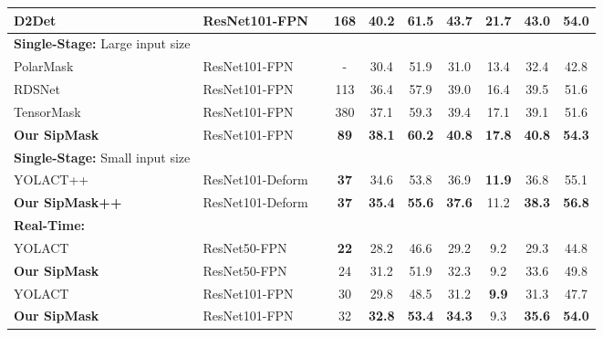 \documentclass[runningheads]{llncs}
\begin{document}
\begin{table*}[t!]
{\begin{tabular}{|l|l|c|c|c|cc|ccc|}
D2Det \cite{Cao_D2Det_CVPR_2020}         & ResNet101-FPN    &  & 168 &  \textbf{40.2} &  61.5 &  \textbf{43.7} &  \textbf{21.7} & \textbf{43.0} &  54.0\\
\hline \hline
\textbf{Single-Stage:}  \footnotesize{Large input size}& & & & & & & & &\\
PolarMask  \cite{Xie_PolarMask_arXiv_2019}       & ResNet101-FPN    &  & - & 30.4  & 51.9 & 31.0 & 13.4 & 32.4 & 42.8 \\
RDSNet   \cite{Wang_RDSNet_AAAI_2020}      & ResNet101-FPN    &  & 113 &  36.4 & 57.9 & 39.0 & 16.4 & 39.5 & 51.6\\
TensorMask  \cite{Chen_TensorMask_ICCV_2019}       & ResNet101-FPN  &    &  380 & 37.1 & 59.3 & 39.4 & 17.1 & 39.1 & 51.6\\
\textbf{Our SipMask}         & ResNet101-FPN   &   &  \textbf{89} & \textbf{38.1} & \textbf{60.2}  & \textbf{40.8} & \textbf{17.8} & \textbf{40.8} & \textbf{54.3}\\
\hline \hline
\textbf{Single-Stage:} \footnotesize{Small input size}& & & & & & & & &\\
YOLACT++  \cite{Bolya_YOLACT++_arXiv_2020}      & ResNet101-Deform &     & \textbf{37} &  34.6 & 53.8 & 36.9 & \textbf{11.9} & 36.8 & 55.1\\
\textbf{Our SipMask++}         & ResNet101-Deform   &  & \textbf{37}  & \textbf{35.4} & \textbf{55.6} & \textbf{37.6} & 11.2 & \textbf{38.3} & \textbf{56.8}\\
\hline
\hline
\textbf{Real-Time:} & & & & & & & & & \\
YOLACT   \cite{Bolya_YOLACT_ICCV_2019}       & ResNet50-FPN &     & \textbf{22} &  28.2  & 46.6  & 29.2  & 9.2  & 29.3  & 44.8 \\
\textbf{Our SipMask}        & ResNet50-FPN   &  &  24  & 31.2 & 51.9 & 32.3 & 9.2 & 33.6 & 49.8\\
\hline
YOLACT   \cite{Bolya_YOLACT_ICCV_2019}       & ResNet101-FPN &     & 30 & 29.8  & 48.5 & 31.2 & \textbf{9.9} & 31.3 & 47.7 \\
\textbf{Our SipMask}          & ResNet101-FPN   &  &  32  & \textbf{32.8} & \textbf{53.4}  & \textbf{34.3} & 9.3 & \textbf{35.6} & \textbf{54.0}\\
\hline
\end{tabular}}
\label{tab_stateofart}
\end{table*}
\end{document}

